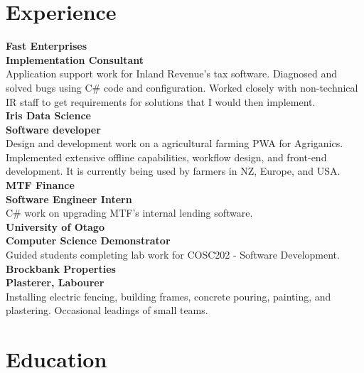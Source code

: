 \documentclass[lighthipster]{simplehipstercv}
\begin{document}
\begin{paracol}{2}
\begin{minipage}[t]{0.7\textwidth}
    \section*{Experience}
    
    \textbf{Fast Enterprises}\\
    \textbf{Implementation Consultant}\\
    Application support work for Inland Revenue's tax software. Diagnosed and solved bugs using C# code and configuration. Worked closely with non-technical IR staff to get requirements for solutions that I would then implement. \\
    
    \textbf{Iris Data Science}\\
    \textbf{Software developer}\\
    Design and development work on a agricultural farming PWA for Agriganics. 
        Implemented extensive offline capabilities, workflow design, and front-end development.
        It is currently being used by farmers in NZ, Europe, and USA.\\
    
    \textbf{MTF Finance}\\
    \textbf{Software Engineer Intern}\\
    C# work on upgrading MTF's internal lending software.\\
    
    \textbf{University of Otago}\\
    \textbf{Computer Science Demonstrator}\\
    Guided students completing lab work for COSC202 - Software Development.\\
    
    \textbf{Brockbank Properties}\\
    \textbf{Plasterer, Labourer}\\
    Installing electric fencing, building frames, concrete pouring, painting, and plastering. Occasional leadings of small teams.\\
      
    \end{minipage}    
    
    \bigskip
    
    \begin{minipage}[t]{0.7\textwidth}
    
    \section*{Education}
    

\end{minipage}
\end{paracol}
\end{document}
